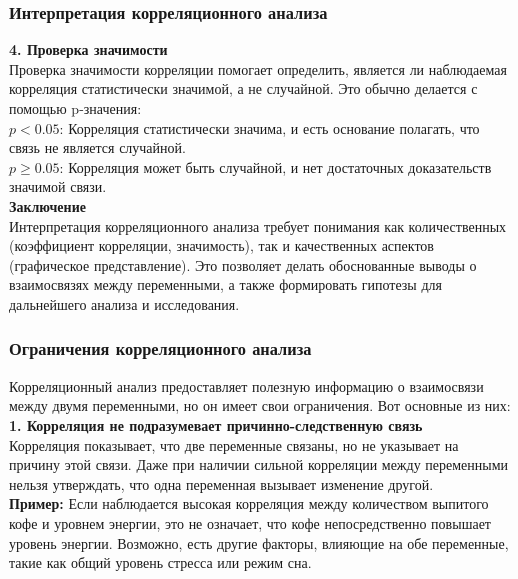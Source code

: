 \documentclass[aspectratio=169]{beamer}
\begin{document}
\begin{frame}
\frametitle{Интерпретация корреляционного анализа}
{\bf 4. Проверка значимости}\\
Проверка значимости корреляции помогает определить, является ли наблюдаемая корреляция статистически значимой, а не случайной. Это обычно делается с помощью p-значения:\\
\quad $p < 0.05$: Корреляция статистически значима, и есть основание полагать, что связь не является случайной.\\
\quad $p \geq 0.05$: Корреляция может быть случайной, и нет достаточных доказательств значимой связи.
\newline\\
{\bf Заключение}\\
Интерпретация корреляционного анализа требует понимания как количественных (коэффициент корреляции, значимость), так и качественных аспектов (графическое представление). Это позволяет делать обоснованные выводы о взаимосвязях между переменными, а также формировать гипотезы для дальнейшего анализа и исследования.
\end{frame}

\begin{frame}
\frametitle{Ограничения корреляционного анализа}
Корреляционный анализ предоставляет полезную информацию о взаимосвязи между двумя переменными, но он имеет свои ограничения. Вот основные из них:
\newline\\
{\bf 1. Корреляция не подразумевает причинно-следственную связь}\\
Корреляция показывает, что две переменные связаны, но не указывает на причину этой связи. Даже при наличии сильной корреляции между переменными нельзя утверждать, что одна переменная вызывает изменение другой.\\
{\bf Пример:} Если наблюдается высокая корреляция между количеством выпитого кофе и уровнем энергии, это не означает, что кофе непосредственно повышает уровень энергии. Возможно, есть другие факторы, влияющие на обе переменные, такие как общий уровень стресса или режим сна.
\end{frame}
\end{document}
